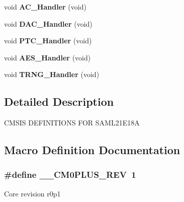 \begin{DoxyCompactItemize}
\item 
\hypertarget{group___s_a_m_l21_e18_a__cmsis_ga591d634cc8d92aabdba828034e30ec92}{}void {\bfseries A\+C\+\_\+\+Handler} (void)\label{group___s_a_m_l21_e18_a__cmsis_ga591d634cc8d92aabdba828034e30ec92}

\item 
\hypertarget{group___s_a_m_l21_e18_a__cmsis_ga8d4b8614e1c8468e26d48a962c57dc70}{}void {\bfseries D\+A\+C\+\_\+\+Handler} (void)\label{group___s_a_m_l21_e18_a__cmsis_ga8d4b8614e1c8468e26d48a962c57dc70}

\item 
\hypertarget{group___s_a_m_l21_e18_a__cmsis_ga1d86b5af01af9f6a15c23a6406dbc31b}{}void {\bfseries P\+T\+C\+\_\+\+Handler} (void)\label{group___s_a_m_l21_e18_a__cmsis_ga1d86b5af01af9f6a15c23a6406dbc31b}

\item 
\hypertarget{group___s_a_m_l21_e18_a__cmsis_gae1a36480dbaa74ad00783e1bdc5be4f2}{}void {\bfseries A\+E\+S\+\_\+\+Handler} (void)\label{group___s_a_m_l21_e18_a__cmsis_gae1a36480dbaa74ad00783e1bdc5be4f2}

\item 
\hypertarget{group___s_a_m_l21_e18_a__cmsis_ga49bc805925cf23257d81ed4b3a21000d}{}void {\bfseries T\+R\+N\+G\+\_\+\+Handler} (void)\label{group___s_a_m_l21_e18_a__cmsis_ga49bc805925cf23257d81ed4b3a21000d}

\end{DoxyCompactItemize}


\subsection{Detailed Description}
C\+M\+S\+I\+S D\+E\+F\+I\+N\+I\+T\+I\+O\+N\+S F\+O\+R S\+A\+M\+L21\+E18\+A 

\subsection{Macro Definition Documentation}
\hypertarget{group___s_a_m_l21_e18_a__cmsis_ga2b7180ed347a0e902c5765deb46e650e}{}
\subsubsection[{\+\_\+\+\_\+\+C\+M0\+P\+L\+U\+S\+\_\+\+R\+E\+V}]{\setlength{\rightskip}{0pt plus 5cm}\#define \+\_\+\+\_\+\+C\+M0\+P\+L\+U\+S\+\_\+\+R\+E\+V~1}\label{group___s_a_m_l21_e18_a__cmsis_ga2b7180ed347a0e902c5765deb46e650e}
Core revision r0p1 \hypertarget{group___s_a_m_l21_e18_a__cmsis_ga4127d1b31aaf336fab3d7329d117f448}{}
